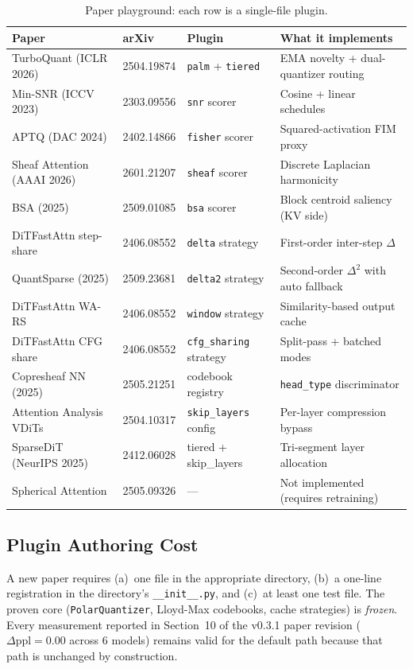 \documentclass[11pt,a4paper]{article}
\begin{document}
\begin{table}[h]
\centering
\caption{Paper playground: each row is a single-file plugin.}
\label{tab:playground}
\small
\begin{tabular}{p{4cm}p{2.2cm}p{4cm}p{4cm}}
\toprule
\textbf{Paper} & \textbf{arXiv} & \textbf{Plugin} & \textbf{What it implements} \\
\midrule
TurboQuant (ICLR 2026) & 2504.19874 & \texttt{palm} + \texttt{tiered} & EMA novelty + dual-quantizer routing \\
Min-SNR (ICCV 2023) & 2303.09556 & \texttt{snr} scorer & Cosine + linear schedules \\
APTQ (DAC 2024) & 2402.14866 & \texttt{fisher} scorer & Squared-activation FIM proxy \\
Sheaf Attention (AAAI 2026) & 2601.21207 & \texttt{sheaf} scorer & Discrete Laplacian harmonicity \\
BSA (2025) & 2509.01085 & \texttt{bsa} scorer & Block centroid saliency (KV side) \\
DiTFastAttn step-share & 2406.08552 & \texttt{delta} strategy & First-order inter-step $\Delta$ \\
QuantSparse (2025) & 2509.23681 & \texttt{delta2} strategy & Second-order $\Delta^2$ with auto fallback \\
DiTFastAttn WA-RS & 2406.08552 & \texttt{window} strategy & Similarity-based output cache \\
DiTFastAttn CFG share & 2406.08552 & \texttt{cfg\_sharing} strategy & Split-pass + batched modes \\
Copresheaf NN (2025) & 2505.21251 & codebook registry & \texttt{head\_type} discriminator \\
Attention Analysis VDiTs & 2504.10317 & \texttt{skip\_layers} config & Per-layer compression bypass \\
SparseDiT (NeurIPS 2025) & 2412.06028 & tiered + skip\_layers & Tri-segment layer allocation \\
Spherical Attention & 2505.09326 & --- & Not implemented (requires retraining) \\
\bottomrule
\end{tabular}
\end{table}

\subsection{Plugin Authoring Cost}

A new paper requires (a)~one file in the appropriate directory, (b)~a one-line registration in the directory's \texttt{\_\_init\_\_.py}, and (c)~at least one test file. The proven core (\texttt{PolarQuantizer}, Lloyd-Max codebooks, cache strategies) is \emph{frozen}. Every measurement reported in Section~10 of the v0.3.1 paper revision ($\Delta\text{ppl}=0.00$ across 6 models) remains valid for the default path because that path is unchanged by construction.
\end{document}
